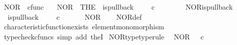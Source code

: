 \begin{isabellebody}
\endisatagproof
{\isafoldproof}%
%
\isadelimproof
%
\endisadelimproof
%
\isadelimdocument
%
\endisadelimdocument
%
\isatagdocument
%
\isamarkuptrue%
%
\endisatagdocument
{\isafolddocument}%
%
\isadelimdocument
%
\endisadelimdocument
{}\isamarkupfalse%
\ NOR\ {\isacharcolon}{\kern0pt}{\isacharcolon}{\kern0pt}\ {\isachardoublequoteopen}cfunc{\isachardoublequoteclose}\ \isanewline
\ \ {\isachardoublequoteopen}NOR\ {\isacharequal}{\kern0pt}\ {\isacharparenleft}{\kern0pt}THE\ {\isasymchi}{\isachardot}{\kern0pt}\ is{\isacharunderscore}{\kern0pt}pullback\ \ {\isasymone}\ {\isasymone}\ {\isacharparenleft}{\kern0pt}{\isasymOmega}\ {\isasymtimes}\isactrlsub c\ {\isasymOmega}{\isacharparenright}{\kern0pt}\ {\isasymOmega}\ {\isacharparenleft}{\kern0pt}{\isasymbeta}\isactrlbsub {\isasymone}\isactrlesub {\isacharparenright}{\kern0pt}\ {\isasymt}\ {\isasymlangle}{\isasymf}{\isacharcomma}{\kern0pt}\ {\isasymf}{\isasymrangle}\ {\isasymchi}{\isacharparenright}{\kern0pt}{\isachardoublequoteclose}\isanewline
\isanewline
{}\isamarkupfalse%
\ NOR{\isacharunderscore}{\kern0pt}is{\isacharunderscore}{\kern0pt}pullback{\isacharcolon}{\kern0pt}\isanewline
\ \ {\isachardoublequoteopen}is{\isacharunderscore}{\kern0pt}pullback\ \ {\isasymone}\ {\isasymone}\ {\isacharparenleft}{\kern0pt}{\isasymOmega}\ {\isasymtimes}\isactrlsub c\ {\isasymOmega}{\isacharparenright}{\kern0pt}\ {\isasymOmega}\ {\isacharparenleft}{\kern0pt}{\isasymbeta}\isactrlbsub {\isasymone}\isactrlesub {\isacharparenright}{\kern0pt}\ {\isasymt}\ {\isasymlangle}{\isasymf}{\isacharcomma}{\kern0pt}\ {\isasymf}{\isasymrangle}\ NOR{\isachardoublequoteclose}\isanewline
%
\isadelimproof
\ \ %
\endisadelimproof
%
\isatagproof
{}\isamarkupfalse%
\ NOR{\isacharunderscore}{\kern0pt}def\isanewline
\ \ \isamarkupfalse%
\ characteristic{\isacharunderscore}{\kern0pt}function{\isacharunderscore}{\kern0pt}exists\ element{\isacharunderscore}{\kern0pt}monomorphism\isanewline
\ \ \isamarkupfalse%
\ {\isacharparenleft}{\kern0pt}typecheck{\isacharunderscore}{\kern0pt}cfuncs{\isacharcomma}{\kern0pt}\ simp\ add{\isacharcolon}{\kern0pt}\ the{}I{}{\isacharparenright}{\kern0pt}%
\endisatagproof
{\isafoldproof}%
%
\isadelimproof
\isanewline
%
\endisadelimproof
\isanewline
{}\isamarkupfalse%
\ NOR{\isacharunderscore}{\kern0pt}type{\isacharbrackleft}{\kern0pt}type{\isacharunderscore}{\kern0pt}rule{\isacharbrackright}{\kern0pt}{\isacharcolon}{\kern0pt}\isanewline
\ \ {\isachardoublequoteopen}NOR\ {\isacharcolon}{\kern0pt}\ {\isasymOmega}\ {\isasymtimes}\isactrlsub c\ {\isasymOmega}\ {\isasymrightarrow}\ {\isasymOmega}{\isachardoublequoteclose}\isanewline

\end{isabellebody}
